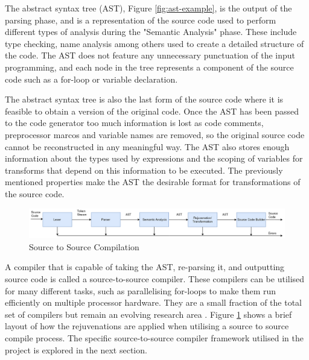 \documentclass[bsc,frontabs,singlespacing,twoside,parskip,deptreport]{infthesis}
\begin{document}
The abstract syntax tree (AST), Figure \ref{fig:ast-example}, is the output of the parsing phase, and is a representation of the source code used to perform different types of analysis during the "Semantic Analysis" phase. These include type checking, name analysis among others used to create a detailed structure of the code. The AST does not feature any unnecessary punctuation of the input programming, and each node in the tree represents a component of the source code such as a for-loop or variable declaration.


The abstract syntax tree is also the last form of the source code where it is feasible to obtain a version of the original code. Once the AST has been passed to the code generator too much information is lost as code comments, preprocessor marcos \cite{C_MARCOS} and variable names are removed, so the original source code cannot be reconstructed in any meaningful way. The AST also stores enough information about the types used by expressions and the scoping of variables for transforms that depend on this information to be executed. The previously mentioned properties make the AST the desirable format for transformations of the source code. 

\begin{figure}[!h]
    \centering
    \includegraphics[width=\textwidth]{images/Compilation-process-src.png}
    \caption{Source to Source Compilation}
    \label{fig:comp_proc_src}
\end{figure}

A compiler that is capable of taking the AST, re-parsing it, and outputting source code is called a source-to-source compiler. These compilers can be utilised for many different tasks, such as parallelising for-loops to make them run efficiently on multiple processor hardware. They are a small fraction of the total set of compilers but remain an evolving research area \cite{SRC_CODE_RES}. Figure \ref{fig:comp_proc_src} shows a brief layout of how the rejuvenations are applied when utilising a source to source compile process. The specific source-to-source compiler framework utilised in the project is explored in the next section.
\end{document}
